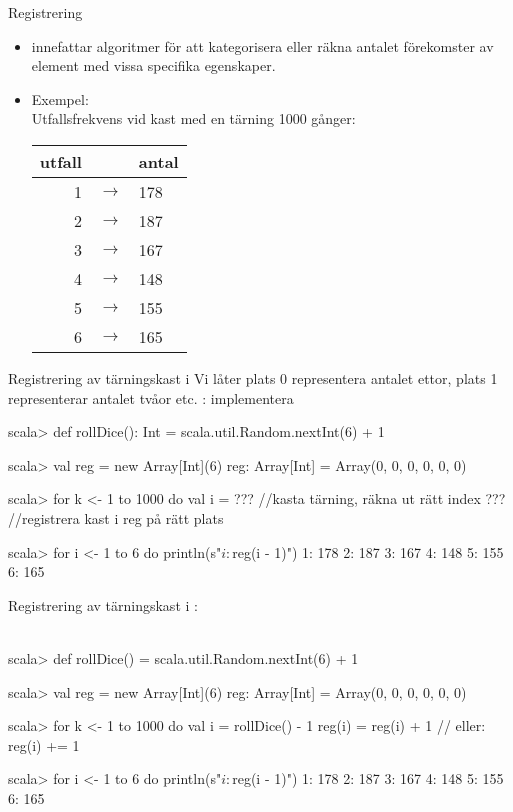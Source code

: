 


\begin{Slide}{Registrering}
\begin{itemize}
\item {} innefattar algoritmer för att kategorisera eller räkna antalet förekomster av element med vissa specifika egenskaper.

\item Exempel:
\\\vspace{0.5em}Utfallsfrekvens vid kast med en tärning 1000 gånger:

\vspace{1em}\begin{tabular}{r c l}
utfall & & antal \\ \hline
1 & $\rightarrow$ & 178 \\
2 & $\rightarrow$ & 187 \\
3 & $\rightarrow$ & 167 \\
4 & $\rightarrow$ & 148 \\
5 & $\rightarrow$ & 155 \\
6 & $\rightarrow$ & 165 \\
\end{tabular}
\end{itemize}
\end{Slide}

\begin{Slide}{Registrering av tärningskast i }
Vi låter plats 0 representera antalet ettor, plats 1 representerar antalet tvåor etc. : implementera 
\begin{REPLsmall}
scala> def rollDice(): Int = scala.util.Random.nextInt(6) + 1

scala> val reg = new Array[Int](6)
reg: Array[Int] = Array(0, 0, 0, 0, 0, 0)

scala> for k <- 1 to 1000 do 
         val i = ??? //kasta tärning, räkna ut rätt index 
         ??? //registrera kast i reg på rätt plats

scala> for i <- 1 to 6 do println(s"$i: ${reg(i - 1)}")
1: 178
2: 187
3: 167
4: 148
5: 155
6: 165
\end{REPLsmall}
\end{Slide}


\begin{Slide}{Registrering av tärningskast i }
:\\~
\begin{REPLsmall}
scala> def rollDice() = scala.util.Random.nextInt(6) + 1

scala> val reg = new Array[Int](6)
reg: Array[Int] = Array(0, 0, 0, 0, 0, 0)

scala> for k <- 1 to 1000 do
         val i = rollDice() - 1 
         reg(i) = reg(i) + 1    // eller: reg(i) += 1

scala> for i <- 1 to 6 do println(s"$i: ${reg(i - 1)}")
1: 178
2: 187
3: 167
4: 148
5: 155
6: 165
\end{REPLsmall}
\end{Slide}

